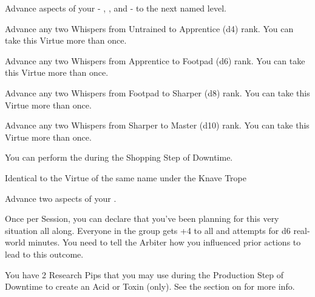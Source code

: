 \begin{multicols*}{2}

Advance  aspects of your  - \DEATH, \INJURY, and \INSANITY - to the next named level. 


Advance any two Whispers from Untrained to Apprentice (d4) rank. You can take this Virtue more than once.


Advance any two Whispers from Apprentice to Footpad (d6) rank. You can take this Virtue more than once.


Advance any two Whispers from Footpad to Sharper (d8) rank. You can take this Virtue more than once.


Advance any two Whispers from Sharper to Master (d10) rank. You can take this Virtue more than once.


You can perform the  during the Shopping Step of Downtime. 


Identical to the Virtue of the same name under the Knave Trope



Advance two  aspects of your  \DCUP.


Once per Session, you can declare that you’ve been planning for this very situation all along. Everyone in the group gets +4 to all \RO and \RB attempts for d6 real-world minutes.  You need to tell the Arbiter how you influenced prior actions to lead to this outcome. 


You have 2 Research Pips that you may use during the Production Step of Downtime to create an Acid or Toxin (only). See the section on  for more info.


\end{multicols*}
